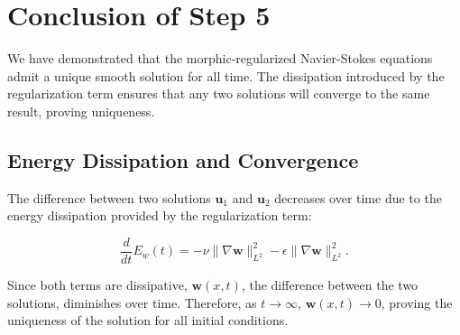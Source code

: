 \documentclass{article}
\begin{document}
\section*{Conclusion of Step 5}

We have demonstrated that the morphic-regularized Navier-Stokes equations admit a unique smooth solution for all time. The dissipation introduced by the regularization term ensures that any two solutions will converge to the same result, proving uniqueness.
\subsection*{Energy Dissipation and Convergence}

The difference between two solutions \( \mathbf{u}_1 \) and \( \mathbf{u}_2 \) decreases over time due to the energy dissipation provided by the regularization term:

\[
\frac{d}{dt} E_w(t) = - \nu \|\nabla \mathbf{w}\|_{L^2}^2 - \epsilon \|\nabla \mathbf{w}\|_{L^2}^2.
\]

Since both terms are dissipative, \( \mathbf{w}(x,t) \), the difference between the two solutions, diminishes over time. Therefore, as \( t \to \infty \), \( \mathbf{w}(x,t) \to 0 \), proving the uniqueness of the solution for all initial conditions.
\end{document}
